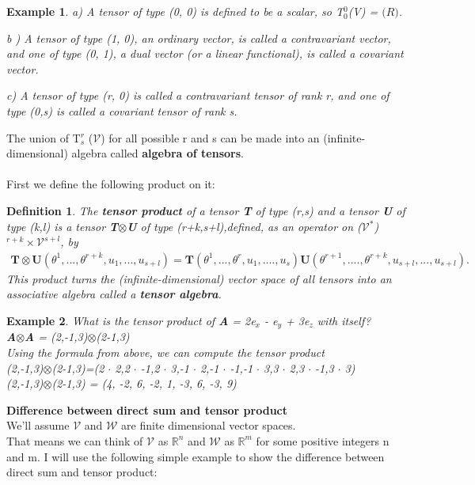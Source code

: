 \documentclass[12pt,a4paper]{article}
\newtheorem{defn}[thm]{Definition}
\newtheorem{exmp}{Example}[section]
\begin{document}
\begin{exmp}
\item[a)]A tensor of type (0, 0) is defined to be a scalar, so T$^0_0$(V) = $\mathbb(R)$.
\item[b]) A tensor of type (1, 0), an ordinary vector, is called a contravariant vector, and one
of type (0, 1), a dual vector (or a linear functional), is called a covariant
vector.
\item[c)] A tensor of type (r, 0) is called a contravariant tensor of rank r,
and one of type (0,s) is called a covariant tensor of rank s.
\end{exmp}
The union of T$^r_s$ ($\mathcal{V}$) for all possible r and s can be made into an (infinite-dimensional) algebra called \textbf{algebra of tensors}.\\\\
First we define the following product on it:
\begin{defn}
The \textbf{tensor product} of a tensor \textbf{T} of type (r,s) and a tensor \textbf{U} of type (k,l) is a tensor \textbf{T}$\otimes$\textbf{U} of type (r+k,s+l),defined, as an operator on ($\mathcal{V}$$^*$)$^{r+k}\times \mathcal{V}^{s+l}$, by 
\begin{align*}
\textbf{T}\otimes\textbf{U}(\theta^1,...,\theta^{r+k},u_1,...,u_{s+l}) = \textbf{T}(\theta^1,...,\theta^r,u_1,....,u_s)\textbf{U}(\theta^{r+1},....,\theta^{r+k},u_{s+l},...,u_{s+l}).
\end{align*}
This product turns the (infinite-dimensional) vector space of all tensors into an associative algebra called a \textbf{tensor algebra}.
\end{defn}
\begin{exmp}
What is the tensor product of \textbf{A} = 2e$_x$ - e$_y$ + 3e$_z$ with itself?\\
\textbf{A}$\otimes$\textbf{A} = (2,-1,3)$\otimes$(2-1,3)\\
Using the formula from above, we can compute the tensor product\\
(2,-1,3)$\otimes$(2-1,3)=(2 $\cdot$ 2,2 $\cdot$ -1,2 $\cdot$ 3,-1 $\cdot$ 2,-1 $\cdot$ -1,-1 $\cdot$ 3,3 $\cdot$ 2,3 $\cdot$ -1,3 $\cdot$ 3)\\
(2,-1,3)$\otimes$(2-1,3) = (4, -2, 6, -2, 1, -3, 6, -3, 9)

\end{exmp}
\textbf{Difference between direct sum and tensor product}\\
We'll assume $\mathcal{V}$ and $\mathcal{W}$ are finite dimensional vector spaces. \\That means we can think of $\mathcal{V}$ as $\mathbb{R}^n$ and $\mathcal{W}$ as $\mathbb{R}^m$ for some positive integers n and m. I will use the following simple example to show the difference between direct sum and tensor product:\\
\end{document}
